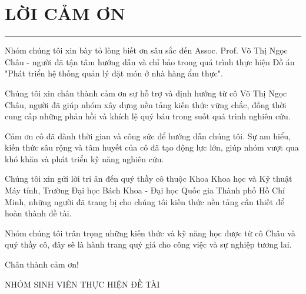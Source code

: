 \null\vfill
\section*{LỜI CẢM ƠN}
\hrule
\vspace{1 cm}
Nhóm chúng tôi xin bày tỏ lòng biết ơn sâu sắc đến Assoc. Prof. Võ Thị Ngọc Châu - người đã tận tâm hướng dẫn và chỉ bảo trong quá trình thực hiện Đồ án "Phát triển hệ thống quản lý đặt món ở nhà hàng ẩm thực".

Chúng tôi xin chân thành cảm ơn sự hỗ trợ và định hướng từ cô Võ Thị Ngọc Châu, người đã giúp nhóm xây dựng nền tảng kiến thức vững chắc, đồng thời cung cấp những phản hồi và khích lệ quý báu trong suốt quá trình nghiên cứu.

Cảm ơn cô đã dành thời gian và công sức để hướng dẫn chúng tôi. Sự am hiểu, kiến thức sâu rộng và tâm huyết của cô đã tạo động lực lớn, giúp nhóm vượt qua khó khăn và phát triển kỹ năng nghiên cứu.

Chúng tôi xin gửi lời tri ân đến quý thầy cô thuộc Khoa Khoa học và Kỹ thuật Máy tính, Trường Đại học Bách Khoa - Đại học Quốc gia Thành phố Hồ Chí Minh, những người đã trang bị cho chúng tôi kiến thức nền tảng cần thiết để hoàn thành đề tài.

Nhóm chúng tôi trân trọng những kiến thức và kỹ năng học được từ cô Châu và quý thầy cô, đây sẽ là hành trang quý giá cho công việc và sự nghiệp tương lai.

Chân thành cảm ơn!

\begin{flushright}
    NHÓM SINH VIÊN THỰC HIỆN ĐỀ TÀI
\end{flushright}